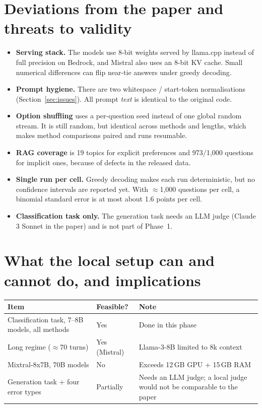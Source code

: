 \documentclass[11pt,a4paper]{article}
\begin{document}
\section{Deviations from the paper and threats to validity}

\begin{itemize}
  \item \textbf{Serving stack.} The models use 8-bit weights served by llama.cpp instead of full precision on Bedrock, and Mistral also uses an 8-bit KV cache.
        Small numerical differences can flip near-tie answers under greedy decoding.
  \item \textbf{Prompt hygiene.} There are two whitespace / start-token normalisations (Section~\ref{sec:issues}). All prompt \emph{text} is identical to the
        original code.
  \item \textbf{Option shuffling} uses a per-question seed instead of one global random stream. It is still random, but identical
        across methods and lengths, which makes method comparisons paired and runs resumable.
  \item \textbf{RAG coverage} is 19 topics for explicit preferences and 973/1{,}000 questions for implicit ones, because of defects in the released data.
  \item \textbf{Single run per cell.} Greedy decoding makes each run deterministic, but no confidence intervals are reported yet.
        With $\approx$1{,}000 questions per cell, a binomial standard error is at most about 1.6 points per cell.
  \item \textbf{Classification task only.} The generation task needs an LLM judge (Claude 3 Sonnet in the paper) and is not part of
        Phase~1.
\end{itemize}

\section{What the local setup can and cannot do, and implications}\label{sec:next}
\begin{center}\small
\begin{tabular}{p{6.2cm}p{2.0cm}p{6.2cm}}
\toprule
Item & Feasible? & Note \\
\midrule
Classification task, 7--8B models, all methods & Yes & Done in this phase \\
Long regime ($\approx$70 turns) & Yes (Mistral) & Llama-3-8B limited to 8k context \\
Mixtral-8x7B, 70B models & No & Exceeds 12\,GB GPU + 15\,GB RAM \\
Generation task + four error types & Partially & Needs an LLM judge; a local judge would not be comparable to the paper \\
\bottomrule
\end{tabular}
\end{center}
\end{document}
